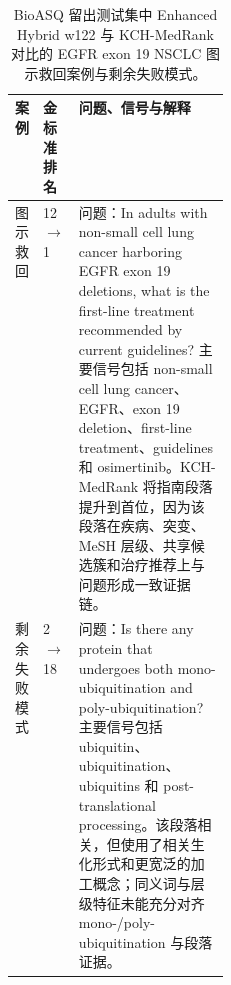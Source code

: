 \begin{table}[t]
\centering
\small
\caption{BioASQ 留出测试集中 Enhanced Hybrid w122 与 KCH-MedRank 对比的 EGFR exon 19 NSCLC 图示救回案例与剩余失败模式。}
\label{tab:case-study}
\begin{tabularx}{\linewidth}{p{0.12\linewidth}p{0.13\linewidth}X}
\toprule
案例 & 金标准排名 & 问题、信号与解释 \\
\midrule
图示救回 & 12 $\rightarrow$ 1 & 问题：In adults with non-small cell lung cancer harboring EGFR exon 19 deletions, what is the first-line treatment recommended by current guidelines? 主要信号包括 non-small cell lung cancer、EGFR、exon 19 deletion、first-line treatment、guidelines 和 osimertinib。KCH-MedRank 将指南段落提升到首位，因为该段落在疾病、突变、MeSH 层级、共享候选簇和治疗推荐上与问题形成一致证据链。 \\
剩余失败模式 & 2 $\rightarrow$ 18 & 问题：Is there any protein that undergoes both mono-ubiquitination and poly-ubiquitination? 主要信号包括 ubiquitin、ubiquitination、ubiquitins 和 post-translational processing。该段落相关，但使用了相关生化形式和更宽泛的加工概念；同义词与层级特征未能充分对齐 mono-/poly-ubiquitination 与段落证据。 \\
\bottomrule
\end{tabularx}
\end{table}
